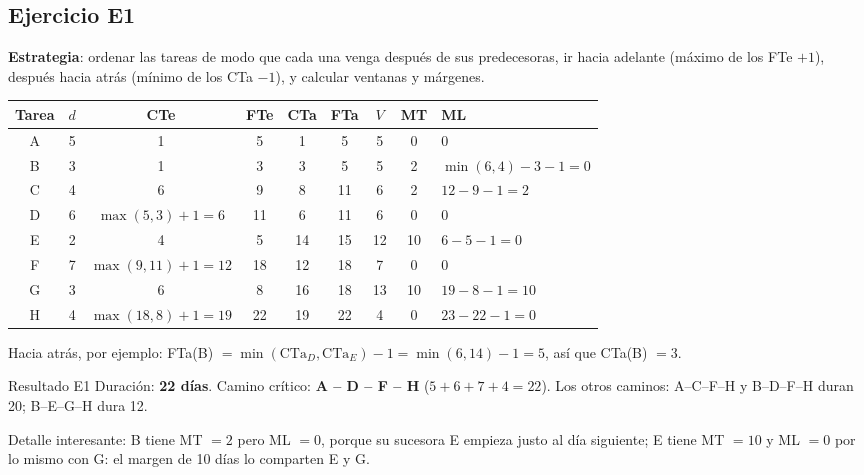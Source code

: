 \documentclass[11pt,a4paper]{article}
\newcommand{\tnode}[9][tarea]{\node[#1,
  label={[temp,anchor=south west,inner sep=1pt]north west:#6},
  label={[temp,anchor=south east,inner sep=1pt]north east:#7},
  label={[tard,anchor=north west,inner sep=1pt]south west:#8},
  label={[tard,anchor=north east,inner sep=1pt]south east:#9}] (#2) at (#3) {\textbf{#4}\hspace{5mm}#5};}
\begin{document}
\subsection*{Ejercicio E1}
\textbf{Estrategia}: ordenar las tareas de modo que cada una venga después de sus predecesoras, ir hacia adelante
(máximo de los FTe $+1$), después hacia atrás (mínimo de los CTa $-1$), y calcular ventanas y márgenes.
\begin{center}
\end{center}
\begin{center}\small
\begin{tabular}{ccccccccl}
\toprule
Tarea & $d$ & CTe & FTe & CTa & FTa & $V$ & MT & ML\\
\midrule
A & 5 & 1 & 5 & 1 & 5 & 5 & 0 & 0\\
B & 3 & 1 & 3 & 3 & 5 & 5 & 2 & $\min(6, 4) - 3 - 1 = 0$\\
C & 4 & 6 & 9 & 8 & 11 & 6 & 2 & $12 - 9 - 1 = 2$\\
D & 6 & $\max(5, 3) + 1 = 6$ & 11 & 6 & 11 & 6 & 0 & 0\\
E & 2 & 4 & 5 & 14 & 15 & 12 & 10 & $6 - 5 - 1 = 0$\\
F & 7 & $\max(9, 11) + 1 = 12$ & 18 & 12 & 18 & 7 & 0 & 0\\
G & 3 & 6 & 8 & 16 & 18 & 13 & 10 & $19 - 8 - 1 = 10$\\
H & 4 & $\max(18, 8) + 1 = 19$ & 22 & 19 & 22 & 4 & 0 & $23 - 22 - 1 = 0$\\
\bottomrule
\end{tabular}
\end{center}
Hacia atrás, por ejemplo: FTa(B) $= \min(\text{CTa}_D, \text{CTa}_E) - 1 = \min(6, 14) - 1 = 5$, así que CTa(B) $= 3$.
\begin{resultado}{Resultado E1}
Duración: \textbf{22 días}. Camino crítico: \textbf{A -- D -- F -- H} ($5 + 6 + 7 + 4 = 22$). Los otros caminos:
A--C--F--H y B--D--F--H duran 20; B--E--G--H dura 12.
\end{resultado}
Detalle interesante: B tiene MT $= 2$ pero ML $= 0$, porque su sucesora E empieza justo al día siguiente; E tiene
MT $= 10$ y ML $= 0$ por lo mismo con G: el margen de 10 días lo comparten E y G.
\end{document}
